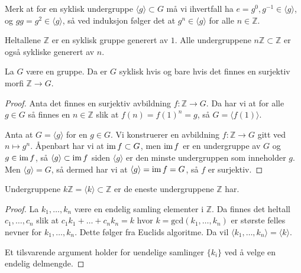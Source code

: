 \begin{remark}\label{rmk:cyclic-structure}
    Merk at for en syklisk undergruppe $\langle g\rangle\subset G$
    må vi ihvertfall ha $e = g^0, g^{-1}\in \langle g\rangle$,
    og $gg = g^2\in \langle g\rangle$,
    så ved induksjon følger det at $g^n\in \langle g\rangle$
    for alle $n\in \mathbb Z$.
\end{remark}

\begin{example}
    Heltallene $\mathbb Z$ er en syklisk gruppe generert av $1$.
    Alle undergruppene $n\mathbb Z\subset \mathbb Z$ er også sykliske generert av
    $n$.
\end{example}

\begin{lemma}
    La $G$ være en gruppe.
    Da er $G$ syklisk hvis og bare hvis det finnes en surjektiv morfi
    $\mathbb Z\to G$.
\end{lemma}
\begin{proof}
    Anta det finnes en surjektiv avbildning $f\colon \mathbb Z\to G$.
    Da har vi at for alle $g\in G$ så finnes en $n\in \mathbb Z$ slik at
    $f(n) = f(1)^n = g$, så $G = \langle f(1)\rangle$.

    Anta at $G = \langle g \rangle$ for en $g\in G$.
    Vi konstruerer en avbildning $f\colon \mathbb Z\to G$
    gitt ved $n\mapsto g^n$.
    Åpenbart har vi at $\operatorname{im} f\subset G$,
    men $\operatorname{im} f$ er en undergruppe av $G$ og $g\in \operatorname{im} f$,
    så $\langle g\rangle\subset \operatorname{im} f$ siden $\langle g\rangle$
    er den minste undergruppen som inneholder $g$.
    Men $\langle g\rangle = G$,
    så dermed har vi at $\langle g \rangle = \operatorname{im} f = G$,
    så $f$ er surjektiv.
\end{proof}

\begin{corollary}
    Undergruppene $k\mathbb Z = \langle k\rangle \subset \mathbb Z$
    er de eneste undergruppene $\mathbb Z$ har.
\end{corollary}
\begin{proof}
    La $k_1, \dots, k_n$ være en endelig samling elementer i $\mathbb Z$.
    Da finnes det heltall $c_1,\dots,c_n$ slik at $c_1 k_1 + \dots + c_n k_n = k$
    hvor $k = \mathrm{gcd}(k_1,\dots,k_n)$
    er største felles nevner for $k_1,\dots, k_n$.
    Dette følger fra Euclids algoritme.
    Da vil $\langle k_1,\dots, k_n\rangle = \langle k\rangle$.

    Et tilsvarende argument holder for uendelige samlinger $\{k_i\}$
    ved å velge en endelig delmengde.
\end{proof}

